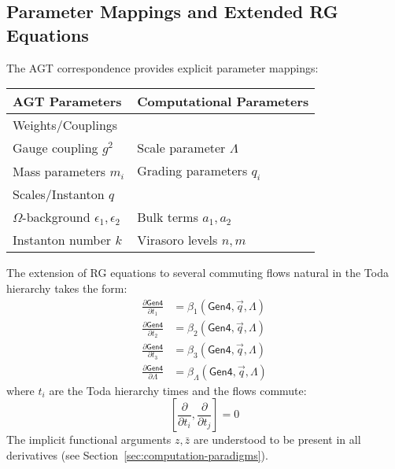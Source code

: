 \subsection{Parameter Mappings and Extended RG Equations}

\begin{definition}
\label{def:agt-parameters}
The AGT correspondence provides explicit parameter mappings:

\begin{table}[h]
\centering
\begin{tabular}{|l|l|}
\hline
\textbf{AGT Parameters} & \textbf{Computational Parameters} \\
\hline
Weights/Couplings & \\
\quad Gauge coupling $g^2$ & Scale parameter $\Lambda$ \\
\quad Mass parameters $m_i$ & Grading parameters $q_i$ \\
\hline
Scales/Instanton $q$ & \\
\quad $\Omega$-background $\epsilon_1, \epsilon_2$ & Bulk terms $a_1, a_2$ \\
\quad Instanton number $k$ & Virasoro levels $n, m$ \\
\hline
\end{tabular}
\end{table}
\end{definition}

\begin{definition}
\label{def:extended-rg-gen4}
The extension of RG equations to several commuting flows natural in the Toda hierarchy takes the form:
\begin{align}
\frac{\partial \mathsf{Gen4}}{\partial t_1} &= \beta_1(\mathsf{Gen4}, \vec{q}, \Lambda) \\
\frac{\partial \mathsf{Gen4}}{\partial t_2} &= \beta_2(\mathsf{Gen4}, \vec{q}, \Lambda) \\
\frac{\partial \mathsf{Gen4}}{\partial t_3} &= \beta_3(\mathsf{Gen4}, \vec{q}, \Lambda) \\
\frac{\partial \mathsf{Gen4}}{\partial \Lambda} &= \beta_\Lambda(\mathsf{Gen4}, \vec{q}, \Lambda)
\end{align}
where $t_i$ are the Toda hierarchy times and the flows commute:
\[
[\frac{\partial}{\partial t_i}, \frac{\partial}{\partial t_j}] = 0
\]
The implicit functional arguments $z, \bar{z}$ are understood to be present in all derivatives (see Section~\ref{sec:computation-paradigms}).
\end{definition}

